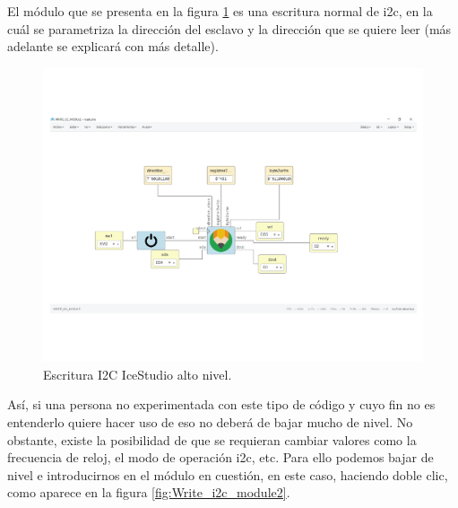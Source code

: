 El módulo que se presenta en la figura \ref{fig:Write_i2c_module} es una escritura normal de i2c, en la cuál se parametriza la dirección del esclavo y la dirección que se quiere leer (más adelante se explicará con más detalle). \newline

\begin{figure}[H]
	\center
	\includegraphics[trim = 0mm 25mm 0mm 0mm, clip,scale=0.4]{imagenes/EstadoArte/Write_i2c_module.pdf}
	\caption{Escritura I2C IceStudio alto nivel.}
	\label{fig:Write_i2c_module}
\end{figure}

Así, si una persona no experimentada con este tipo de código y cuyo fin no es entenderlo quiere hacer uso de eso no deberá de bajar mucho de nivel.\newline
No obstante, existe la posibilidad de que se requieran cambiar valores como la frecuencia de reloj, el modo de operación i2c, etc.
Para ello podemos bajar de nivel e introducirnos en el módulo en cuestión, en este caso, haciendo doble clic, como aparece en la figura \ref{fig:Write_i2c_module2}. 

